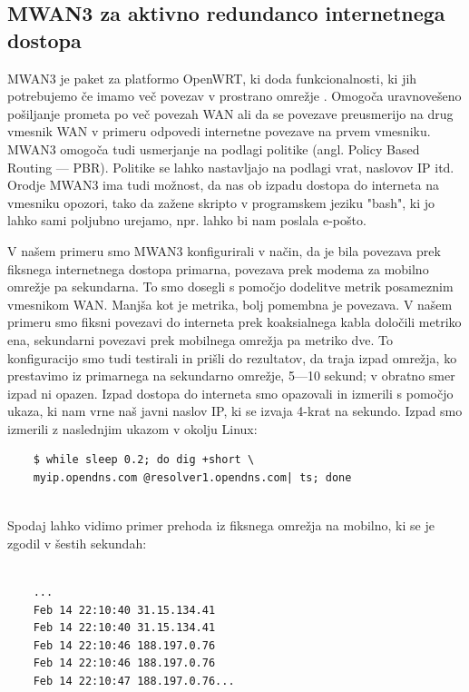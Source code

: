 \documentclass[a4paper, 12pt]{book}
\begin{document}
\subsection{MWAN3 za aktivno redundanco internetnega dostopa}
\label {MWAN3}
MWAN3 je paket za platformo OpenWRT, ki doda funkcionalnosti, ki jih potrebujemo če imamo več povezav v prostrano omrežje \cite{dyck_mwan3_2013}. Omogoča uravnovešeno pošiljanje prometa po več povezah WAN ali da se povezave preusmerijo na drug vmesnik WAN v primeru odpovedi internetne povezave na prvem vmesniku. MWAN3 omogoča tudi usmerjanje na podlagi politike (angl. Policy Based Routing --- PBR). Politike se lahko nastavljajo na podlagi vrat, naslovov IP itd. Orodje MWAN3 ima tudi možnost, da nas ob izpadu dostopa do interneta na vmesniku opozori, tako da zažene skripto v programskem jeziku "bash", ki jo lahko sami poljubno urejamo, npr. lahko bi nam poslala e-pošto.

V našem primeru smo MWAN3 konfigurirali v način, da je bila povezava prek fiksnega internetnega dostopa primarna, povezava prek modema za mobilno omrežje pa sekundarna. To smo dosegli s pomočjo dodelitve metrik posameznim vmesnikom WAN. Manjša kot je metrika, bolj pomembna je povezava. V našem primeru smo  fiksni povezavi do interneta prek koaksialnega kabla določili metriko ena, sekundarni povezavi prek mobilnega omrežja pa metriko dve. To konfiguracijo smo tudi testirali in prišli do rezultatov, da traja izpad omrežja, ko prestavimo iz primarnega na sekundarno omrežje, 5---10 sekund; v obratno smer izpad ni opazen. Izpad dostopa do interneta smo opazovali in izmerili s pomočjo ukaza, ki nam vrne naš javni naslov IP, ki se izvaja 4-krat na sekundo.
Izpad smo izmerili z naslednjim ukazom v okolju Linux:

\begin{code}

\begin{verbatim}
    $ while sleep 0.2; do dig +short \
    myip.opendns.com @resolver1.opendns.com| ts; done
    

\end{verbatim}
\label{command_publicIP}

\end{code}
\hspace{1cm}

Spodaj lahko vidimo primer prehoda iz fiksnega omrežja na mobilno, ki se je zgodil v šestih sekundah:

\begin{code}
\begin{verbatim}

    ...
    Feb 14 22:10:40 31.15.134.41
    Feb 14 22:10:40 31.15.134.41
    Feb 14 22:10:46 188.197.0.76
    Feb 14 22:10:46 188.197.0.76
    Feb 14 22:10:47 188.197.0.76...

\end{verbatim}
\end{code}
\hspace{1cm}
\end{document}
